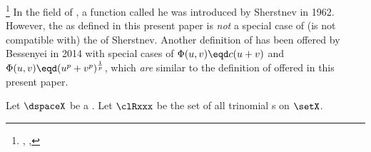 \begin{remark}
\footnote{
  ,
  ,
  }
In the field of , 
a function called he  was introduced by Sherstnev in 1962.
However, the  as defined in this present paper is \emph{not} a special case of
(is not compatible with) the  of Sherstnev.
Another definition of  has been offered by Bessenyei in 2014
with special cases of $\Phi(u,v)\eqd c(u+v)$ and $\Phi(u,v)\eqd(u^p+v^p)^\frac{1}{p}$,
which \emph{are} similar to the definition of  offered in this present paper.
\end{remark}

\begin{definition}
\label{def:trirel}
\label{def:pdspace}
\label{def:ptineq}
Let $\dspaceX$ be a .
Let $\clRxxx$ be the set of all trinomial s  on $\setX$.
\end{definition}

